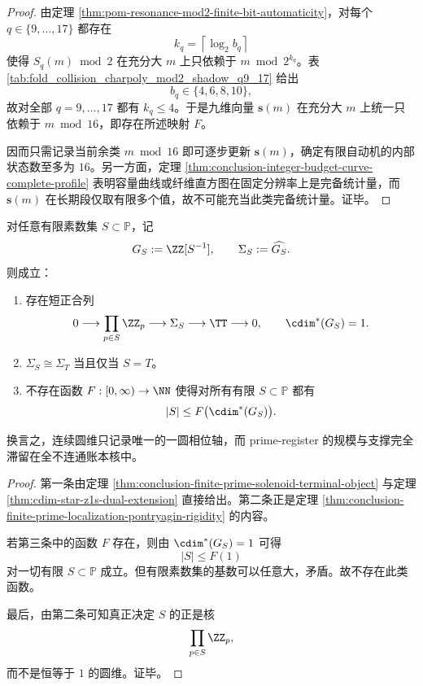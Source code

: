 \begin{proof}
由定理 \ref{thm:pom-resonance-mod2-finite-bit-automaticity}，对每个 \(q\in\{9,\dots,17\}\) 都存在
\[
k_q=\left\lceil\log_2 b_q\right\rceil
\]
使得 \(S_q(m)\bmod 2\) 在充分大 \(m\) 上只依赖于 \(m\bmod 2^{k_q}\)。表 \ref{tab:fold_collision_charpoly_mod2_shadow_q9_17} 给出
\[
b_q\in\{4,6,8,10\},
\]
故对全部 \(q=9,\dots,17\) 都有 \(k_q\le 4\)。于是九维向量 \(\mathbf s(m)\) 在充分大 \(m\) 上统一只依赖于 \(m\bmod 16\)，即存在所述映射 \(F\)。

因而只需记录当前余类 \(m\bmod 16\) 即可逐步更新 \(\mathbf s(m)\)，确定有限自动机的内部状态数至多为 \(16\)。另一方面，定理 \ref{thm:conclusion-integer-budget-curve-complete-profile} 表明容量曲线或纤维直方图在固定分辨率上是完备统计量，而 \(\mathbf s(m)\) 在长期段仅取有限多个值，故不可能充当此类完备统计量。证毕。
\end{proof}

\begin{proposition}\label{prop:conclusion-circle-dimension-prime-ledger-strict-orthogonality}
对任意有限素数集 \(S\subset\mathbb P\)，记
\[
G_S:=\ZZ[S^{-1}],
\qquad
\Sigma_S:=\widehat{G_S}.
\]
则成立：
\begin{enumerate}
  \item 存在短正合列
  \[
  0\longrightarrow \prod_{p\in S}\ZZ_p
  \longrightarrow \Sigma_S
  \longrightarrow \TT
  \longrightarrow 0,
  \qquad
  \cdim^\ast(G_S)=1.
  \]
  \item \(\Sigma_S\cong \Sigma_T\) 当且仅当 \(S=T\)。
  \item 不存在函数 \(F:[0,\infty)\to\NN\) 使得对所有有限 \(S\subset\mathbb P\) 都有
  \[
  |S|\le F\bigl(\cdim^\ast(G_S)\bigr).
  \]
\end{enumerate}
换言之，连续圆维只记录唯一的一圆相位轴，而 prime-register 的规模与支撑完全滞留在全不连通账本核中。
\end{proposition}

\begin{proof}
第一条由定理 \ref{thm:conclusion-finite-prime-solenoid-terminal-object} 与定理 \ref{thm:cdim-star-z1s-dual-extension} 直接给出。第二条正是定理 \ref{thm:conclusion-finite-prime-localization-pontryagin-rigidity} 的内容。

若第三条中的函数 \(F\) 存在，则由 \(\cdim^\ast(G_S)=1\) 可得
\[
|S|\le F(1)
\]
对一切有限 \(S\subset\mathbb P\) 成立。但有限素数集的基数可以任意大，矛盾。故不存在此类函数。

最后，由第二条可知真正决定 \(S\) 的正是核
\[
\prod_{p\in S}\ZZ_p,
\]
而不是恒等于 \(1\) 的圆维。证毕。
\end{proof}

